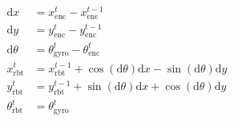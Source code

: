 \documentclass{article}
\begin{document}
\begin{center}
	\begin{align*}
		\mathrm{d}x&=x^{t}_{\mathrm{enc}}-x^{t-1}_{\mathrm{enc}} \\
		\mathrm{d}y&=y^{t}_{\mathrm{enc}}-y^{t-1}_{\mathrm{enc}} \\
		\mathrm{d}\theta&=\theta^t_{\mathrm{gyro}}-\theta^{t}_{\mathrm{enc}} \\
		x^t_{\mathrm{rbt}}&=x^{t-1}_{\mathrm{rbt}}+\cos(\mathrm{d}\theta)\mathrm{d}x-\sin(\mathrm{d}\theta)\mathrm{d}y \\
		y^t_{\mathrm{rbt}}&=y^{t-1}_{\mathrm{rbt}}+\sin(\mathrm{d}\theta)\mathrm{d}x+\cos(\mathrm{d}\theta)\mathrm{d}y \\
		\theta^t_{\mathrm{rbt}}&=\theta^t_{\mathrm{gyro}}
	\end{align*}
\end{center}
\end{document}

